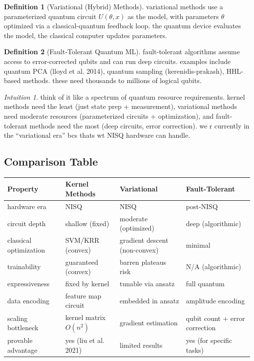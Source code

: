 \documentclass[11pt,a4paper]{article}
\theoremstyle{definition}
\newtheorem{definition}{Definition}[section]
\theoremstyle{remark}
\newtheorem*{intuition}{Intuition}
\begin{document}
\begin{definition}[Variational (Hybrid) Methods]
variational methods use a parameterized quantum circuit $U(\theta, x)$ as the model, with parameters $\theta$ optimized via a classical-quantum feedback loop. the quantum device evaluates the model, the classical computer updates parameters.
\end{definition}

\begin{definition}[Fault-Tolerant Quantum ML]
fault-tolerant algorithms assume access to error-corrected qubits and can run deep circuits. examples include quantum PCA (lloyd et al. 2014), quantum sampling (kerenidis-prakash), HHL-based methods. these need thousands to millions of logical qubits.
\end{definition}

\begin{intuition}
think of it like a spectrum of quantum resource requirements. kernel methods need the least (just state prep + measurement), variational methods need moderate resources (parameterized circuits + optimization), and fault-tolerant methods need the most (deep circuits, error correction). we r currently in the ``variational era'' bcs thats wt NISQ hardware can handle.
\end{intuition}

\subsection{Comparison Table}

\begin{center}
\renewcommand{\arraystretch}{1.4}
\begin{tabular}{|p{3cm}|p{3.5cm}|p{3.5cm}|p{3.5cm}|}
\hline
\textbf{Property} & \textbf{Kernel Methods} & \textbf{Variational} & \textbf{Fault-Tolerant} \\
\hline
hardware era & NISQ & NISQ & post-NISQ \\
\hline
circuit depth & shallow (fixed) & moderate (optimized) & deep (algorithmic) \\
\hline
classical optimization & SVM/KRR (convex) & gradient descent (non-convex) & minimal \\
\hline
trainability & guaranteed (convex) & barren plateaus risk & N/A (algorithmic) \\
\hline
expressiveness & fixed by kernel & tunable via ansatz & full quantum \\
\hline
data encoding & feature map circuit & embedded in ansatz & amplitude encoding \\
\hline
scaling bottleneck & kernel matrix $O(n^2)$ & gradient estimation & qubit count + error correction \\
\hline
provable advantage & yes (liu et al. 2021) & limited results & yes (for specific tasks) \\
\hline
\end{tabular}
\end{center}
\end{document}
